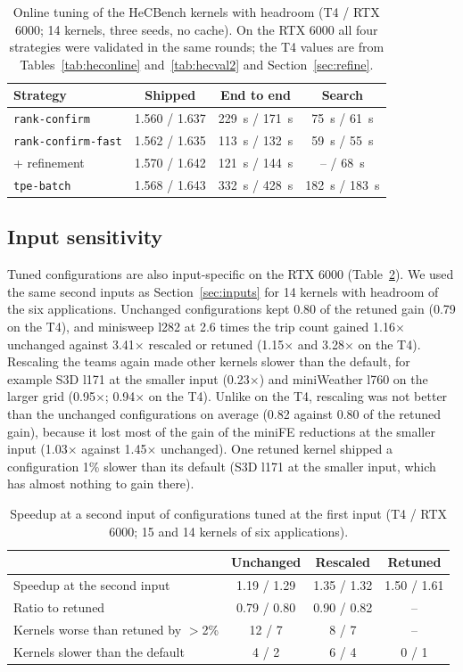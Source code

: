 \documentclass[10pt]{article}
\newcommand{\x}{\ensuremath{\times}}
\newcommand{\code}[1]{\texttt{#1}}
\begin{document}
\begin{table}[t]
\centering
\caption{Online tuning of the HeCBench kernels with headroom (T4 / RTX 6000; 14
kernels, three seeds, no cache). On the RTX 6000 all four strategies were
validated in the same rounds; the T4 values are from
Tables~\ref{tab:heconline} and~\ref{tab:hecval2} and Section~\ref{sec:refine}.}
\label{tab:repl-heconline}
\small
\begin{tabular}{lccc}
\toprule
Strategy & Shipped & End to end & Search \\
\midrule
\code{rank-confirm} & 1.560 / 1.637 & 229~s / 171~s & 75~s / 61~s \\
\code{rank-confirm-fast} & 1.562 / 1.635 & 113~s / 132~s & 59~s / 55~s \\
\quad + refinement & 1.570 / 1.642 & 121~s / 144~s & -- / 68~s \\
\code{tpe-batch} & 1.568 / 1.643 & 332~s / 428~s & 182~s / 183~s \\
\bottomrule
\end{tabular}
\end{table}

\subsection{Input sensitivity}
Tuned configurations are also input-specific on the RTX 6000
(Table~\ref{tab:repl-inputs}). We used the same second inputs as
Section~\ref{sec:inputs} for 14 kernels with headroom of the six applications.
Unchanged configurations kept 0.80 of the retuned gain (0.79 on the T4), and
minisweep l282 at 2.6 times the trip count gained 1.16\x{} unchanged against
3.41\x{} rescaled or retuned (1.15\x{} and 3.28\x{} on the T4). Rescaling the teams
again made other kernels slower than the default, for example S3D l171 at the
smaller input (0.23\x{}) and miniWeather l760 on the larger grid (0.95\x{}; 0.94\x{}
on the T4). Unlike on the T4, rescaling was not better than the unchanged
configurations on average (0.82 against 0.80 of the retuned gain), because
it lost most of the gain of the miniFE reductions at the smaller input
(1.03\x{} against 1.45\x{} unchanged). One retuned kernel shipped a configuration
1\% slower than its default (S3D l171 at the smaller input, which has almost
nothing to gain there).

\begin{table}[t]
\centering
\caption{Speedup at a second input of configurations tuned at the first input
(T4 / RTX 6000; 15 and 14 kernels of six applications).}
\label{tab:repl-inputs}
\small
\begin{tabular}{lccc}
\toprule
& Unchanged & Rescaled & Retuned \\
\midrule
Speedup at the second input & 1.19 / 1.29 & 1.35 / 1.32 & 1.50 / 1.61 \\
Ratio to retuned & 0.79 / 0.80 & 0.90 / 0.82 & -- \\
Kernels worse than retuned by $>$2\% & 12 / 7 & 8 / 7 & -- \\
Kernels slower than the default & 4 / 2 & 6 / 4 & 0 / 1 \\
\bottomrule
\end{tabular}
\end{table}
\end{document}
